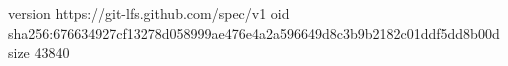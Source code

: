 version https://git-lfs.github.com/spec/v1
oid sha256:676634927cf13278d058999ae476e4a2a596649d8c3b9b2182c01ddf5dd8b00d
size 43840
